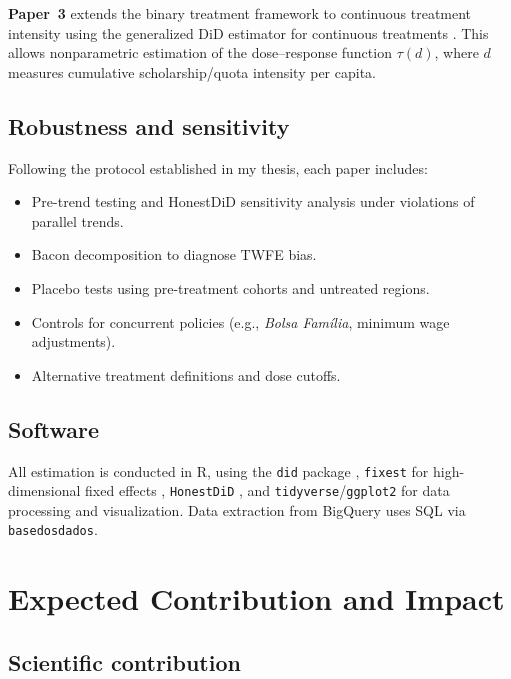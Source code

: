 \documentclass[a4paper,11pt]{article}
\begin{document}
\textbf{Paper~3} extends the binary treatment framework to continuous treatment intensity using the generalized DiD estimator for continuous treatments \citep{callaway2024}. This allows nonparametric estimation of the dose--response function $\tau(d)$, where $d$ measures cumulative scholarship/quota intensity per capita.

\subsection{Robustness and sensitivity}

Following the protocol established in my thesis, each paper includes:
\begin{itemize}[nosep]
    \item Pre-trend testing and HonestDiD sensitivity analysis \citep{rambachan2023} under violations of parallel trends.
    \item Bacon decomposition \citep{goodmanbacon2021} to diagnose TWFE bias.
    \item Placebo tests using pre-treatment cohorts and untreated regions.
    \item Controls for concurrent policies (e.g., \textit{Bolsa Fam\'ilia}, minimum wage adjustments).
    \item Alternative treatment definitions and dose cutoffs.
\end{itemize}

\subsection{Software}

All estimation is conducted in R, using the \texttt{did} package \citep{callaway2021}, \texttt{fixest} for high-dimensional fixed effects \citep{berge2018}, \texttt{HonestDiD} \citep{rambachan2023}, and \texttt{tidyverse}/\texttt{ggplot2} for data processing and visualization. Data extraction from BigQuery uses SQL via \texttt{basedosdados}.

\section{Expected Contribution and Impact}

\subsection{Scientific contribution}
\end{document}
